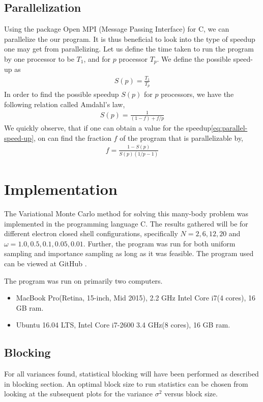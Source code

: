 \documentclass[11pt]{article}
\newcommand{\CC}{C\nolinebreak\hspace{-.05em}\raisebox{.4ex}{\tiny\bf +}\nolinebreak\hspace{-.10em}\raisebox{.4ex}{\tiny\bf +}}
\def\CC{{C\nolinebreak[4]\hspace{-.05em}\raisebox{.4ex}{\tiny\bf ++}}}
\begin{document}
\subsection{Parallelization}
Using the package Open MPI (Message Passing Interface) for \CC, we can parallelize the our program. It is thus beneficial to look into the type of speedup one may get from parallelizing. Let us define the time taken to run the program by one processor to be $T_1$, and for $p$ processor $T_p$. We define the possible speed-up as
\begin{align}
	S(p) = \frac{T_1}{T_p}
	\label{eq:parallel-speed-up}
\end{align}
In order to find the possible speedup $S(p)$ for $p$ processors, we have the following relation called Amdahl's law\cite{Amdahl:1967:VSP:1465482.1465560},
\begin{align}
	S(p) = \frac{1}{(1-f) + f/p}
	\label{eq:amdahls-law}
\end{align}
We quickly observe, that if one can obtain a value for the speedup\eqref{eq:parallel-speed-up}, on can find the fraction $f$ of the program that is parallelizable by,
\begin{align}
	f = \frac{1-S(p)}{S(p)(1/p-1)}
	\label{eq:f-parallelizable-fraction}
\end{align}

\section{Implementation}
The Variational Monte Carlo method for solving this many-body problem was implemented in the programming language \CC. The results gathered will be for different electron closed shell configurations, specifically $N = 2, 6, 12, 20$ and $\omega = 1.0, 0.5, 0.1, 0.05, 0.01$. Further, the program was run for both uniform sampling and importance sampling as long as it was feasible. The program used can be viewed at GitHub \cite{github}.

The program was run on primarily two computers.
\begin{itemize}
	\item MacBook Pro(Retina, 15-inch, Mid 2015), 2.2 GHz Intel Core i7(4 cores), 16 GB ram.
	\item Ubuntu 16.04 LTS, Intel Core i7-2600 3.4 GHz(8 cores), 16 GB ram.
\end{itemize}

\subsection{Blocking}
For all variances found, statistical blocking will have been performed as described in blocking section. An optimal block size to run statistics can be chosen from looking at the subsequent plots for the variance $\sigma^2$ versus block size.
\end{document}

